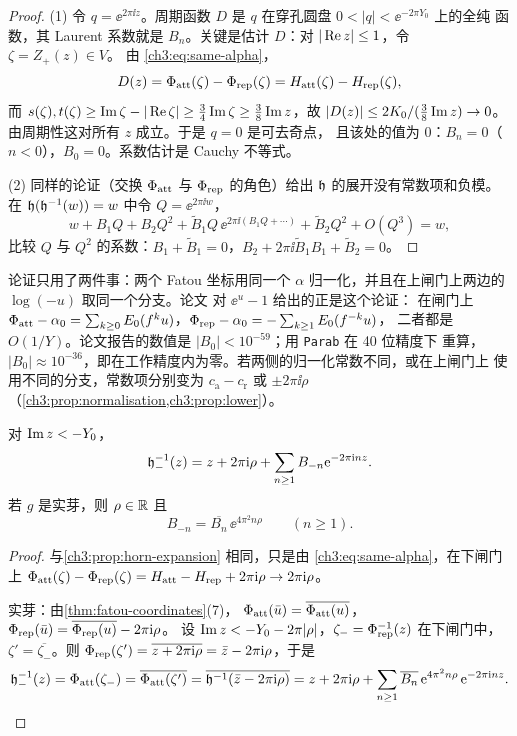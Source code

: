 \begin{proof}
(1) 令 $q=\ee^{2\pi\ii z}$。周期函数 $D$ 是 $q$ 在穿孔圆盘 $0<|q|<\ee^{-2\pi Y_0}$ 上的全纯
函数，其 Laurent 系数就是 $B_n$。关键是估计 $D$：对 $|\operatorname{Re} z|\le1$，令 $\zeta=Z_+(z)\in V$。
由 \eqref{ch3:eq:same-alpha}，
\[
 D(z)=\Phi_{\mathrm{att}}(\zeta)-\Phi_{\mathrm{rep}}(\zeta)=H_{\mathrm{att}}(\zeta)-H_{\mathrm{rep}}(\zeta),
\]
而 $s(\zeta),t(\zeta)\ge\operatorname{Im}\zeta-|\operatorname{Re}\zeta|\ge\tfrac34\operatorname{Im}\zeta\ge\tfrac38\operatorname{Im} z$，故
$|D(z)|\le2K_0/(\tfrac38\operatorname{Im} z)\to0$。由周期性这对所有 $z$ 成立。于是 $q=0$ 是可去奇点，
且该处的值为 $0$：$B_n=0$（$n<0$），$B_0=0$。系数估计是 Cauchy 不等式。

(2) 同样的论证（交换 $\Phi_{\mathrm{att}}$ 与 $\Phi_{\mathrm{rep}}$ 的角色）给出 $\mathfrak h$ 的展开没有常数项和负模。
在 $\mathfrak h(\mathfrak h^{-1}(w))=w$ 中令 $Q=\ee^{2\pi\ii w}$，
\[
 w+B_1Q+B_2Q^2+\tilde B_1Q\,\ee^{2\pi\ii(B_1Q+\cdots)}+\tilde B_2Q^2+O(Q^3)=w ,
\]
比较 $Q$ 与 $Q^2$ 的系数：$B_1+\tilde B_1=0$，$B_2+2\pi\ii\tilde B_1B_1+\tilde B_2=0$。
\end{proof}

\begin{remark}[为什么 $B_0=0$]\label{ch3:rem:B0}
论证只用了两件事：两个 Fatou 坐标用同一个 $\alpha$ 归一化，并且在上闸门上两边的
$\log(-u)$ 取同一个分支。论文 \cite[\S4, (d)]{KneserPaper} 对 $\ee^u-1$ 给出的正是这个论证：
在闸门上 $\Phi_{\mathrm{att}}-\alpha_0=\sum_{k\ge0}E_0(f^ku)$，$\Phi_{\mathrm{rep}}-\alpha_0=-\sum_{k\ge1}E_0(f^{-k}u)$，
二者都是 $O(1/Y)$。论文报告的数值是 $|B_0|<10^{-59}$；用 \texttt{Parab} 在 40 位精度下
重算，$|B_0|\approx10^{-36}$，即在工作精度内为零。若两侧的归一化常数不同，或在上闸门上
使用不同的分支，常数项分别变为 $c_{\mathrm a}-c_{\mathrm r}$ 或 $\pm2\pi\ii\rho$
（\cref{ch3:prop:normalisation,ch3:prop:lower}）。
\end{remark}

\begin{proposition}[下 horn 映射]\label{ch3:prop:lower}
对 $\operatorname{Im} z<-Y_0$，
\[
 \mathfrak h_-^{-1}(z)=z+2\pi\mathrm{i}\rho+\sum_{n\ge1}B_{-n}\mathrm{e}^{-2\pi\mathrm{i} nz}.
\]
若 $g$ 是实芽，则 $\rho\in\mathbb{R}$ 且
\[
 B_{-n}=\overline{B_n}\,\ee^{4\pi^2n\rho}\qquad(n\ge1).
\]
\end{proposition}

\begin{proof}
与\cref{ch3:prop:horn-expansion} 相同，只是由 \eqref{ch3:eq:same-alpha}，在下闸门上
$\Phi_{\mathrm{att}}(\zeta)-\Phi_{\mathrm{rep}}(\zeta)=H_{\mathrm{att}}-H_{\mathrm{rep}}+2\pi\mathrm{i}\rho\to2\pi\mathrm{i}\rho$。

实芽：由\cref{thm:fatou-coordinates}(7)，
$\Phi_{\mathrm{att}}(\bar u)=\overline{\Phi_{\mathrm{att}}(u)}$，$\Phi_{\mathrm{rep}}(\bar u)=\overline{\Phi_{\mathrm{rep}}(u)}-2\pi\mathrm{i}\rho$。
设 $\operatorname{Im} z<-Y_0-2\pi|\rho|$，$\zeta_-=\Phi_{\mathrm{rep}}^{-1}(z)$ 在下闸门中，$\zeta'=\overline{\zeta_-}$。则
$\Phi_{\mathrm{rep}}(\zeta')=\overline{z+2\pi\mathrm{i}\rho}=\bar z-2\pi\mathrm{i}\rho$，于是
\[
 \mathfrak h_-^{-1}(z)=\Phi_{\mathrm{att}}(\zeta_-)=\overline{\Phi_{\mathrm{att}}(\zeta')}
 =\overline{\mathfrak h^{-1}(\bar z-2\pi\mathrm{i}\rho)}
 =z+2\pi\mathrm{i}\rho+\sum_{n\ge1}\overline{B_n}\,\mathrm{e}^{4\pi^2n\rho}\,\mathrm{e}^{-2\pi\mathrm{i} nz}.\qedhere
\]
\end{proof}

